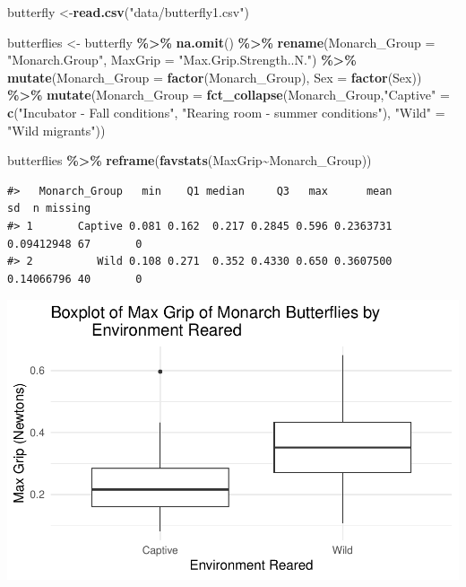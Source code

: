\documentclass[
]{report}
\newenvironment{Shaded}{\begin{snugshade}}{\end{snugshade}}
\newcommand{\AttributeTok}[1]{\textcolor[rgb]{0.13,0.29,0.53}{#1}}
\newcommand{\FunctionTok}[1]{\textcolor[rgb]{0.13,0.29,0.53}{\textbf{#1}}}
\newcommand{\NormalTok}[1]{#1}
\newcommand{\OtherTok}[1]{\textcolor[rgb]{0.56,0.35,0.01}{#1}}
\newcommand{\SpecialCharTok}[1]{\textcolor[rgb]{0.81,0.36,0.00}{\textbf{#1}}}
\newcommand{\StringTok}[1]{\textcolor[rgb]{0.31,0.60,0.02}{#1}}
\begin{document}
\begin{Shaded}
\begin{Highlighting}[]
\NormalTok{butterfly }\OtherTok{\textless{}{-}}\FunctionTok{read.csv}\NormalTok{(}\StringTok{"data/butterfly1.csv"}\NormalTok{)}

\NormalTok{butterflies }\OtherTok{\textless{}{-}}\NormalTok{ butterfly }\SpecialCharTok{\%\textgreater{}\%} \FunctionTok{na.omit}\NormalTok{() }\SpecialCharTok{\%\textgreater{}\%}
    \FunctionTok{rename}\NormalTok{(}\AttributeTok{Monarch\_Group =} \StringTok{"Monarch.Group"}\NormalTok{,}
           \AttributeTok{MaxGrip =} \StringTok{"Max.Grip.Strength..N."}\NormalTok{) }\SpecialCharTok{\%\textgreater{}\%}
    \FunctionTok{mutate}\NormalTok{(}\AttributeTok{Monarch\_Group =} \FunctionTok{factor}\NormalTok{(Monarch\_Group),}
           \AttributeTok{Sex =} \FunctionTok{factor}\NormalTok{(Sex)) }\SpecialCharTok{\%\textgreater{}\%}
    \FunctionTok{mutate}\NormalTok{(}\AttributeTok{Monarch\_Group =} \FunctionTok{fct\_collapse}\NormalTok{(Monarch\_Group,}\StringTok{"Captive"} \OtherTok{=} \FunctionTok{c}\NormalTok{(}\StringTok{"Incubator {-} Fall conditions"}\NormalTok{, }\StringTok{"Rearing room {-} summer conditions"}\NormalTok{), }\StringTok{"Wild"} \OtherTok{=} \StringTok{"Wild migrants"}\NormalTok{))}

\NormalTok{butterflies }\SpecialCharTok{\%\textgreater{}\%}
    \FunctionTok{reframe}\NormalTok{(}\FunctionTok{favstats}\NormalTok{(MaxGrip}\SpecialCharTok{\textasciitilde{}}\NormalTok{Monarch\_Group))}
\end{Highlighting}
\end{Shaded}

\begin{verbatim}
#>   Monarch_Group   min    Q1 median     Q3   max      mean         sd  n missing
#> 1       Captive 0.081 0.162  0.217 0.2845 0.596 0.2363731 0.09412948 67       0
#> 2          Wild 0.108 0.271  0.352 0.4330 0.650 0.3607500 0.14066796 40       0
\end{verbatim}

\begin{center}\includegraphics[width=0.7\linewidth]{12-VN12-1ofeach_files/figure-latex/unnamed-chunk-6-1} \end{center}
\end{document}
